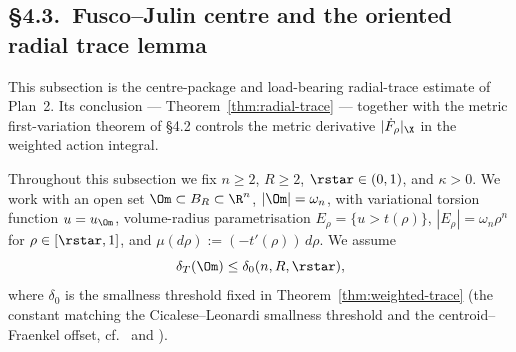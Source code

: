 
\subsection{\S4.3.\ Fusco--Julin centre and the oriented radial trace lemma}
\label{sec:plan2-fj-radial}

This subsection is the centre-package and load-bearing radial-trace
estimate of Plan~2. Its conclusion --- Theorem~\ref{thm:radial-trace} ---
together with the metric first-variation theorem of \S4.2 controls the
metric derivative $|\dot F_\rho|_{\X}$ in the weighted action integral.

Throughout this subsection we fix $n\ge 2$, $R\ge 2$, $\rstar\in(0,1)$,
and $\kappa>0$. We work with an open set $\Om\subset B_R\subset\R^n$,
$|\Om|=\omega_n$, with variational torsion function $u=u_\Om$, volume-radius
parametrisation $E_\rho=\{u>t(\rho)\}$, $|E_\rho|=\omega_n\rho^n$ for
$\rho\in[\rstar,1]$, and $\mu(d\rho):=(-t'(\rho))\,d\rho$. We assume
\begin{equation}\label{eq:fj-smallness}
   \delta_T(\Om)\le\delta_0(n,R,\rstar),
\end{equation}
where $\delta_0$ is the smallness threshold fixed in
Theorem~\ref{thm:weighted-trace} (the constant matching the
Cicalese--Leonardi smallness threshold and the centroid--Fraenkel offset,
cf.\ \cite[Prop.~2.3]{CL2012} and \cite[Thm.~1.1]{FJ2014}).

